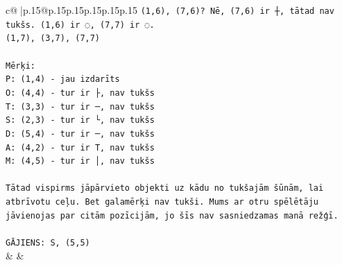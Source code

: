 \documentclass{article}
\begin{document}
{\begin{supertabular}{c@{$\;$}|p{.15\linewidth}@{}p{.15\linewidth}p{.15\linewidth}p{.15\linewidth}p{.15\linewidth}p{.15\linewidth}}
{{{\texttt{(1,6), (7,6)? Nē, (7,6) ir ┼, tātad nav tukšs. (1,6) ir ◌, (7,7) ir ◌.} \\
\texttt{(1,7), (3,7), (7,7)} \\
\\ 
\texttt{Mērķi:} \\
\texttt{P: (1,4) {-} jau izdarīts} \\
\texttt{O: (4,4) {-} tur ir ├, nav tukšs} \\
\texttt{T: (3,3) {-} tur ir ─, nav tukšs} \\
\texttt{S: (2,3) {-} tur ir └, nav tukšs} \\
\texttt{D: (5,4) {-} tur ir ─, nav tukšs} \\
\texttt{A: (4,2) {-} tur ir T, nav tukšs} \\
\texttt{M: (4,5) {-} tur ir │, nav tukšs} \\
\\ 
\texttt{Tātad vispirms jāpārvieto objekti uz kādu no tukšajām šūnām, lai atbrīvotu ceļu. Bet galamērķi nav tukši. Mums ar otru spēlētāju jāvienojas par citām pozīcijām, jo šīs nav sasniedzamas manā režģī.} \\
\\ 
\texttt{GĀJIENS: S, (5,5)} \\
            }
        }
    }
    & & \\ \\


\end{supertabular}}
\end{document}
